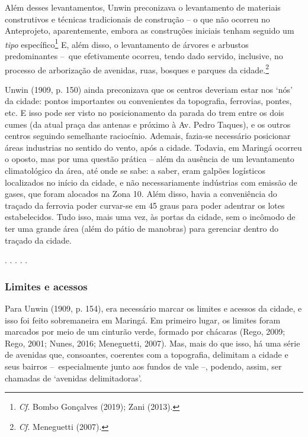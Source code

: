 \documentclass[12pt, a4paper]{book} %
\begin{document}
        Além desses levantamentos, Unwin preconizava o levantamento de materiais construtivos e técnicas tradicionais de construção – o que não ocorreu no Anteprojeto, aparentemente, embora as construções iniciais tenham seguido um \textit{tipo} específico\footnote[21]{\textit{Cf.} Bombo Gonçalves (2019); Zani (2013).} E, além disso, o levantamento de árvores e arbustos predominantes – que efetivamente ocorreu, tendo dado servido, inclusive, no processo de arborização de avenidas, ruas, bosques e parques da cidade.\footnote[22]{\textit{Cf.} Meneguetti (2007).}

        Unwin (1909, p. 150) ainda preconizava que os centros deveriam estar nos `nós' da cidade: pontos importantes ou convenientes da topografia, ferrovias, pontes, etc. E isso pode ser visto no posicionamento da parada do trem entre os dois cumes (da atual praça das antenas e próximo à Av. Pedro Taques), e os outros centros seguindo semelhante raciocínio. Ademais, fazia-se necessário posicionar áreas industrias no sentido do vento, após a cidade. Todavia, em Maringá ocorreu o oposto, mas por uma questão prática – além da ausência de um levantamento climatológico da área, até onde se sabe: a saber, eram galpões logísticos localizados no início da cidade, e não necessariamente indústrias com emissão de gases, que foram alocados na Zona 10. Além disso, havia a conveniência do traçado da ferrovia poder curvar-se em 45 graus para poder adentrar os lotes estabelecidos. Tudo isso, mais uma vez, às portas da cidade, sem o incômodo de ter uma grande área (além do pátio de manobras) para gerenciar dentro do traçado da cidade.

        \begin{center}
            . . . . .
        \end{center} 

                \subsubsection*{Limites e acessos}

        Para Unwin (1909, p. 154), era necessário marcar os limites e acessos da cidade, e isso foi feito sobremaneira em Maringá. Em primeiro lugar, os limites foram marcados por meio de um cinturão verde, formado por chácaras (Rego, 2009; Rego, 2001; Nunes, 2016; Meneguetti, 2007). Mas, mais do que isso, há uma série de avenidas que, consoantes, coerentes com a topografia, delimitam a cidade e seus bairros – especialmente junto aos fundos de vale –, podendo, assim, ser chamadas de `avenidas delimitadoras'.
\end{document}
